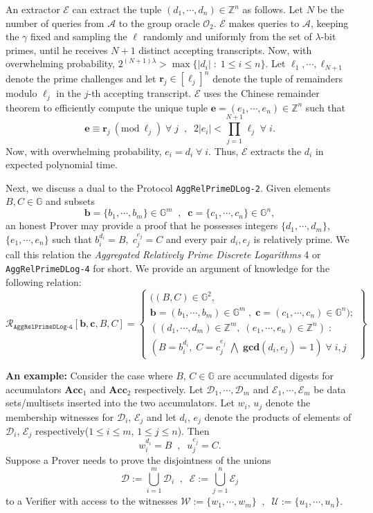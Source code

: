 \documentclass[11pt, lettersize, notitlepage, leqno, footskip=0.6cm]{article}
\newcommand{\bz}{\mathbb Z}
\newcommand{\pl}{\prod\limits}
\newcommand{\ttt}{\texttt}
\newcommand{\bG}{\mathbb{G}}
\newcommand{\Acc}{\mbf{Acc}}
\newcommand{\mc}{\mathcal}
\newcommand{\mb}{\mathbb}
\newcommand{\mbf}{\mathbf}
\newcommand{\lam}{\lambda}
\newcommand{\A}{\mc{A}}
\newcommand{\vs}{\vspace{-0.15cm}}
\newcommand{\op}{overwhelming probability}
\newcommand{\Mod}[1]{\ (\mathrm{mod}\ #1)}
\newcommand{\GCD}{\mbf{gcd}}
\newcommand{\E}{\mc{E}}
\numberwithin{equation}{section}
\begin{document}
\begin{prf}
An extractor $\E$ can extract the tuple $(d_1,\cdots,d_n)\in\bz^n$ as follows. Let $N$ be the number of queries from $\A$ to the group oracle $\mc{O}_2$. $\E$ makes queries to $\A$, keeping the $\gamma$ fixed and sampling the $\ell$ randomly and uniformly from the set of $\lam$-bit primes, until he receives $N+1$ distinct accepting transcripts. Now, with \op, $2^{(N+1)\lam} > \max\{|d_i|\;:\;1\leq i\leq n \}$. Let $\ell_1,\cdots,\ell_{N+1}$ denote the prime challenges and let $\mbf{r}_j\in [\ell_j]^n$ denote the tuple of remainders modulo $\ell_j$ in the $j$-th accepting transcript. $\E$ uses the Chinese remainder theorem to efficiently compute the unique tuple $\mbf{e} = (e_1,\cdots,e_n)\in \bz^n$ such that \vspace{-0.3cm} $$\mbf{e}\equiv \mbf{r}_j\Mod{\ell_j}\;\forall\; j\;\;,\;\;2|e_i|< \pl_{j=1}^{N+1} \ell_j\;\forall\; i.$$ Now, with \op, $e_i = d_i\;\forall\;i.$ Thus, $\E$ extracts the $d_i$ in expected polynomial time. \end{prf}



\bigskip

Next, we discuss a dual to the Protocol \verb|AggRelPrimeDLog-2|. Given elements $B, C\in \mb{G}$ and subsets \vspace{-0.15cm}$$\mbf{b} = \{b_1,\cdots, b_m\}\in \mb{G}^m \;\;,\;\; \mbf{c} = \{c_1,\cdots, c_n\}\in \mb{G}^n,$$ an honest Prover may provide a proof that he possesses integers $\{d_1,\cdots, d_m\}$, $\{e_1,\cdots, e_n\}$ such that $b_i^{d_i} = B,\; c_j^{e_j} = C$ and every pair $d_i, e_j$ is relatively prime. We call this relation the \textit{Aggregated Relatively Prime Discrete Logarithms} 4 or \verb|AggRelPrimeDLog-4| for short. We provide an argument of knowledge for the following relation:
\[
  \mc{R}_{\ttt{AggRelPrimeDLog-4}}[\mbf{b}, \mbf{c}, B, C] = \left\{\begin{array}{l}
    ((B,C)\in\mb{G}^2,\;\\
     \mbf{b} = (b_1,\cdots,b_m)\in\mb{G}^m\;,\;\mbf{c} = (c_1,\cdots, c_n)\in\mb{G}^n);\\
    ((d_1,\cdots,d_m)\in\bz^m,\; (e_1,\cdots,e_n)\in\bz^n)\;: \\
    (B = b_i^{d_i},\; C = c_j^{e_j}\;\bigwedge \; \GCD(d_i, e_j) = 1)\;\forall \;i,j
  \end{array}\right\}
\] 

\noindent \textbf{An example:} Consider the case where $B$, $C\in\bG$ are accumulated digests for accumulators $\Acc_1$ and $\Acc_2$ respectively. Let $\mc{D}_1,\cdots,\mc{D}_m$ and $\mc{E}_1,\cdots,\mc{E}_m$ be data sets/multisets inserted into the two accumulators. Let $w_i$, $u_j$ denote the membership witnesses for $\mc{D}_i$, $\mc{E}_j$ and let $d_i$, $e_j$ denote the products of elements of $\mc{D}_i$, $\mc{E}_j$ respectively($1\leq i\leq m$, $1\leq j\leq n$). Then $$w_i^{d_i} = B\;\;,\;\; u_j^{e_j} = C.$$ Suppose a Prover needs to prove the disjointness of the unions \vs $$\mc{D} := \bigcup\limits_{i=1}^m \mc{D}_i\;\;,\;\;\mc{E} := \bigcup\limits_{j=1}^n \mc{E}_j$$ to a Verifier with access to the witnesses $\mc{W}:= \{w_1,\cdots,w_m \}\;\;,\;\;\mc{U}:= \{u_1,\cdots,u_n \}.$
\end{document}
